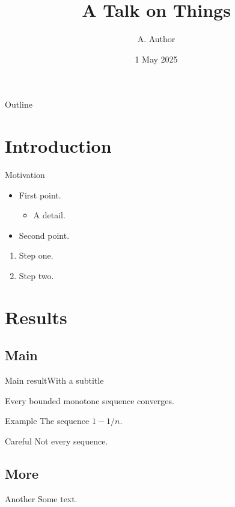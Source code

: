 \documentclass[12pt]{beamer}
\title[Short]{A Talk on Things}
\author{A. Author}
\institute{Institute}
\date{1 May 2025}
\begin{document}
\begin{frame}
\titlepage
\end{frame}
\begin{frame}{Outline}
\tableofcontents
\end{frame}
\section{Introduction}
\begin{frame}{Motivation}
\begin{itemize}
\item First point.
\begin{itemize}
\item A detail.
\end{itemize}
\item Second point.
\end{itemize}
\begin{enumerate}
\item Step one.
\item Step two.
\end{enumerate}
\end{frame}
\section{Results}
\subsection{Main}
\begin{frame}{Main result}{With a subtitle}
\begin{theorem}
Every bounded monotone sequence converges.
\end{theorem}
\begin{exampleblock}{Example}
The sequence $1 - 1/n$.
\end{exampleblock}
\begin{alertblock}{Careful}
Not every sequence.
\end{alertblock}
\end{frame}
\subsection{More}
\begin{frame}{Another}
Some text.
\end{frame}
\end{document}
